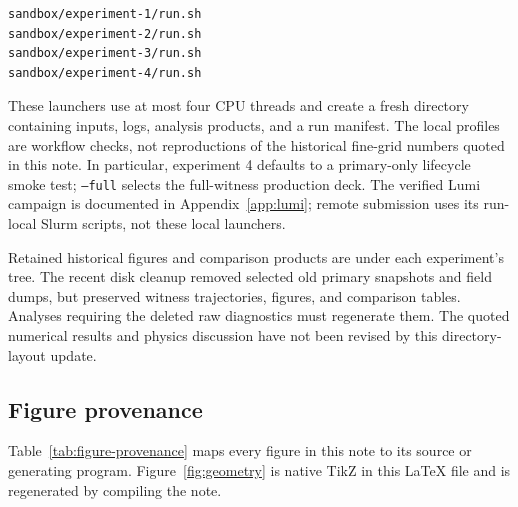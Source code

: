\documentclass[11pt,a4paper]{article}
\newcommand{\code}[1]{\texttt{#1}}
\begin{document}
\begin{lstlisting}[style=commands]
sandbox/experiment-1/run.sh
sandbox/experiment-2/run.sh
sandbox/experiment-3/run.sh
sandbox/experiment-4/run.sh
\end{lstlisting}

These launchers use at most four CPU threads and create a fresh
 directory containing inputs, logs, analysis products,
and a run manifest.  The local profiles are workflow checks, not reproductions
of the historical fine-grid numbers quoted in this note.  In particular,
experiment 4 defaults to a primary-only lifecycle smoke test; \code{--full}
selects the full-witness production deck.  The verified Lumi campaign is
documented in Appendix~\ref{app:lumi}; remote submission uses its run-local
Slurm scripts, not these local launchers.

Retained historical figures and comparison products are under each experiment's
 tree.  The recent disk cleanup removed selected old
primary snapshots and field dumps, but preserved witness trajectories, figures,
and comparison tables.  Analyses requiring the deleted raw diagnostics must
regenerate them.  The quoted numerical results and physics discussion have not
been revised by this directory-layout update.

\subsection{Figure provenance}

Table~\ref{tab:figure-provenance} maps every figure in this note to its source
or generating program.  Figure~\ref{fig:geometry} is native TikZ in this
\LaTeX{} file and is regenerated by compiling the note.
\end{document}
